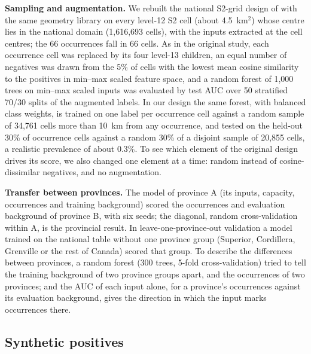 \documentclass[pdflatex,sn-apa]{sn-jnl}
\begin{document}
\textbf{Sampling and augmentation.} We rebuilt the national S2-grid design of \citet{Parsa2024} with the same geometry library on every level-12 S2 cell (about 4.5~km$^2$) whose centre lies in the national domain (1,616,693 cells), with the inputs extracted at the cell centres; the 66 occurrences fall in 66 cells. As in the original study, each occurrence cell was replaced by its four level-13 children, an equal number of negatives was drawn from the 5\% of cells with the lowest mean cosine similarity to the positives in min--max scaled feature space, and a random forest of 1,000 trees on min--max scaled inputs was evaluated by test AUC over 50 stratified 70/30 splits of the augmented labels. In our design the same forest, with balanced class weights, is trained on one label per occurrence cell against a random sample of 34,761 cells more than 10~km from any occurrence, and tested on the held-out 30\% of occurrence cells against a random 30\% of a disjoint sample of 20,855 cells, a realistic prevalence of about 0.3\%. To see which element of the original design drives its score, we also changed one element at a time: random instead of cosine-dissimilar negatives, and no augmentation.

\textbf{Transfer between provinces.} The model of province A (its inputs, capacity, occurrences and training background) scored the occurrences and evaluation background of province B, with six seeds; the diagonal, random cross-validation within A, is the provincial result. In leave-one-province-out validation a model trained on the national table without one province group (Superior, Cordillera, Grenville or the rest of Canada) scored that group. To describe the differences between provinces, a random forest (300 trees, 5-fold cross-validation) tried to tell the training background of two province groups apart, and the occurrences of two provinces; and the AUC of each input alone, for a province's occurrences against its evaluation background, gives the direction in which the input marks occurrences there.

\subsection{Synthetic positives}\label{sec:augmentation}
\end{document}
